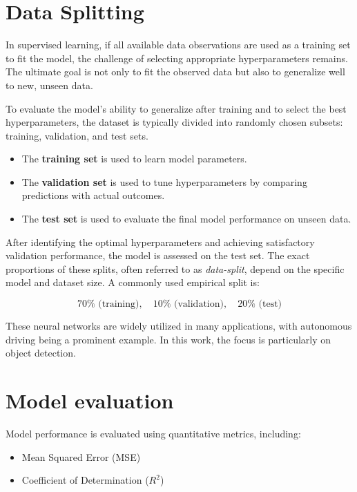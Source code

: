\section{Data Splitting}

In supervised learning, if all available data observations are used as a training set to fit the model, the challenge of selecting appropriate hyperparameters remains. The ultimate goal is not only to fit the observed data but also to generalize well to new, unseen data. 

To evaluate the model's ability to generalize after training and to select the best hyperparameters, the dataset is typically divided into randomly chosen subsets: training, validation, and test sets.

\begin{itemize}
    \item The \textbf{training set} is used to learn model parameters.
    \item The \textbf{validation set} is used to tune hyperparameters by comparing predictions with actual outcomes.
    \item The \textbf{test set} is used to evaluate the final model performance on unseen data.
\end{itemize}

After identifying the optimal hyperparameters and achieving satisfactory validation performance, the model is assessed on the test set. The exact proportions of these splits, often referred to as \textit{data-split}, depend on the specific model and dataset size. A commonly used empirical split is:

\begin{equation}
70\% \text{ (training)}, \quad 10\% \text{ (validation)}, \quad 20\% \text{ (test)}
\end{equation}

These neural networks are widely utilized in many applications, with autonomous driving being a prominent example. In this work, the focus is particularly on object detection.

\section{Model evaluation}

Model performance is evaluated using quantitative metrics, including:
\begin{itemize}
    \item Mean Squared Error (MSE)
    \item Coefficient of Determination (\( R^2 \))
\end{itemize}

